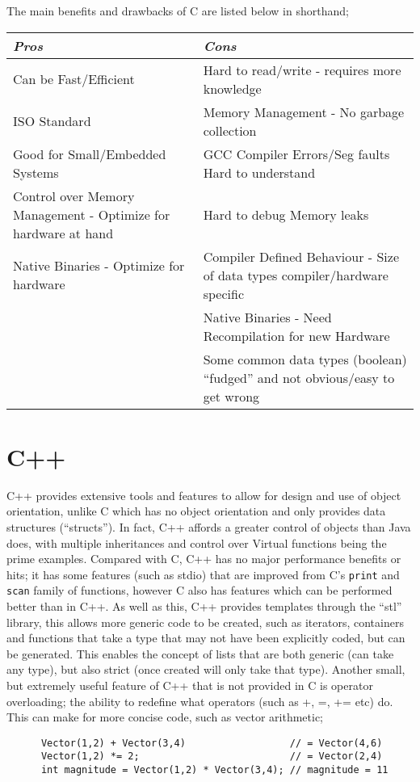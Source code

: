 \documentclass[10pt]{article}
\begin{document}
    The main benefits and drawbacks of C are listed below in shorthand;\\
    \begin{tabular}{| p{7cm} | p{7cm} |}
      \hline
      \emph{Pros} & \emph{Cons} \\ \hline \hline
      
      Can be Fast/Efficient & Hard to read/write - requires more knowledge \\ \hline
      ISO Standard & Memory Management - No garbage collection \\ \hline
      Good for Small/Embedded Systems & GCC Compiler Errors/Seg faults Hard to understand \\ \hline
      Control over Memory Management - Optimize for hardware at hand & Hard to debug Memory leaks \\ \hline
      Native Binaries - Optimize for hardware & Compiler Defined Behaviour - Size of data types compiler/hardware specific \\ \hline
       & Native Binaries - Need Recompilation for new Hardware\\ \hline
       & Some common data types (boolean) ``fudged'' and not obvious/easy to get wrong\\ \hline
    \end{tabular}

  \newpage

  \section{C++}
    C++ provides extensive tools and features to allow for design and use of object orientation, unlike C which has no object orientation and only provides data structures (``structs''). In fact, C++ affords a greater control of objects than Java does, with multiple inheritances and control over Virtual functions being the prime examples. Compared with C, C++ has no major performance benefits or hits; it has some features (such as stdio) that are improved from C's \texttt{print} and \texttt{scan} family of functions, however C also has features which can be performed better than in C++. As well as this, C++ provides templates through the ``stl'' library, this allows more generic code to be created, such as iterators, containers and functions that take a type that may not have been explicitly coded, but can be generated. This enables the concept of lists that are both generic (can take any type), but also strict (once created will only take that type). Another small, but extremely useful feature of C++ that is not provided in C is operator overloading; the ability to redefine what operators (such as +, =, += etc) do. This can make for more concise code, such as vector arithmetic;
    \begin{verbatim}
      Vector(1,2) + Vector(3,4)                  // = Vector(4,6)
      Vector(1,2) *= 2;                          // = Vector(2,4)
      int magnitude = Vector(1,2) * Vector(3,4); // magnitude = 11
    \end{verbatim}
\end{document}

